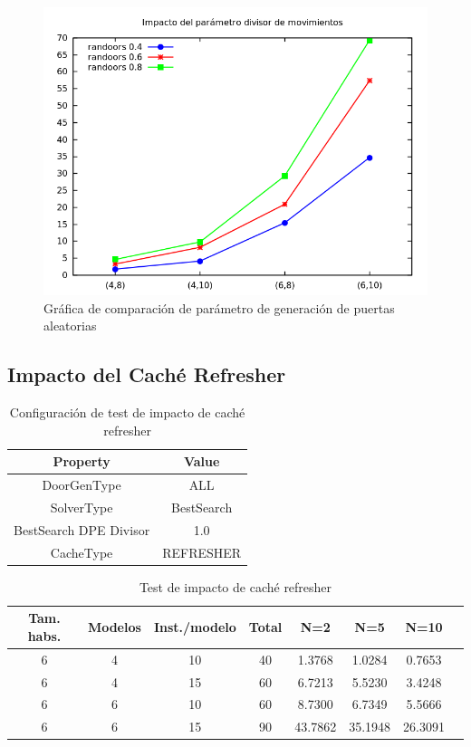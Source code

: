 \begin{figure}[H]
\centering
\includegraphics[scale=0.5]{img/randoors}
\caption{Gráfica de comparación de parámetro de generación de puertas aleatorias
\label{fig:grfrandoors}}
\end{figure}


\subsection{Impacto del Caché Refresher}

\begin{table}[H]
\begin{center}
	\begin{tabular}{ | c | c | }
\hline
 		Property & Value \\ \hline
DoorGenType & ALL \\ 
SolverType & BestSearch \\ 
BestSearch DPE Divisor & 1.0 \\ 
CacheType & REFRESHER \\ 
\hline
	\end{tabular}
\end{center}
\caption{Configuración de test de impacto de caché refresher}
\label{table:cfg-refresher}
\end{table}



\begin{table}[H]
\begin{center}
	\begin{tabular}{ | c | c | c | c | c | c | c | c |}
\hline
Tam. habs. & Modelos & Inst./modelo & Total & N=2 & N=5 & N=10 \\ \hline 
6 & 4 & 10 & 40 & 1.3768 & 1.0284 & 0.7653 \\ 
6 & 4 & 15 & 60 & 6.7213 & 5.5230 & 3.4248 \\ 
6 & 6 & 10 & 60 & 8.7300 & 6.7349 & 5.5666 \\ 
6 & 6 & 15 & 90 & 43.7862 & 35.1948 & 26.3091 \\ 
\hline
	\end{tabular}
\end{center}
\caption{Test de impacto de caché refresher}
\label{table:refresher}
\end{table}


